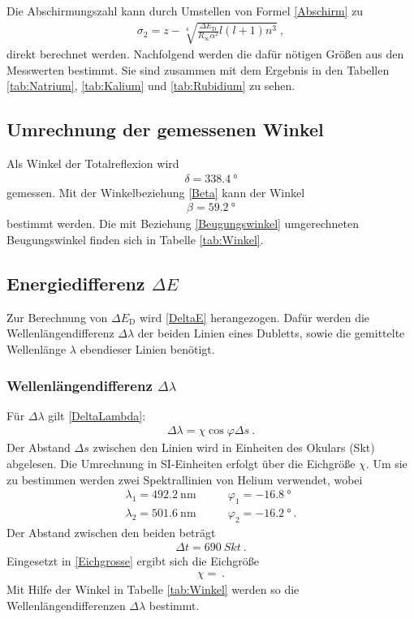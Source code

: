 Die Abschirmungszahl kann durch Umstellen von Formel \eqref{Abschirm} zu
\begin{align}
	\sigma_2 = z - \sqrt[4]{\frac{\Delta E_\text{D}}{R_\infty\alpha^2}l(l+1)n^3} \ ,
\end{align}
direkt berechnet werden. Nachfolgend werden die dafür nötigen Größen aus den Messwerten bestimmt. Sie sind zusammen mit dem Ergebnis in den Tabellen \ref{tab:Natrium}, \ref{tab:Kalium} und \ref{tab:Rubidium} zu sehen.
\subsection{Umrechnung der gemessenen Winkel \label{sec:Umrechnung}}
Als Winkel der Totalreflexion wird
\begin{align}
	\delta = \SI{338.4}{\degree}
\end{align}
gemessen. Mit der Winkelbeziehung \eqref{Beta} kann der Winkel
\begin{align}
	\beta = \SI{59.2}{\degree}
\end{align}
bestimmt werden. Die mit Beziehung \eqref{Beugungswinkel} umgerechneten Beugungswinkel finden sich in Tabelle \ref{tab:Winkel}.

\subsection{Energiedifferenz $\Delta E$}
Zur Berechnung von $\Delta E_\text{D}$ wird \eqref{DeltaE} herangezogen. Dafür werden die Wellenlängendifferenz $\Delta\lambda$ der beiden Linien eines Dubletts, sowie die gemittelte Wellenlänge $\lambda$ ebendieser Linien benötigt.
\clearpage

\subsubsection{Wellenlängendifferenz $\Delta\lambda$}
Für $\Delta\lambda$ gilt \eqref{DeltaLambda}:
\begin{align}
	\Delta\lambda = \chi\cos\varphi\Delta s \ .
\end{align}
Der Abstand $\Delta s$ zwischen den Linien wird in Einheiten des Okulars  (\si{Skt}) abgelesen. Die Umrechnung in SI-Einheiten erfolgt über die Eichgröße $\chi$. Um sie zu bestimmen werden zwei Spektrallinien von Helium verwendet, wobei
\begin{align}
	\lambda_1 = \SI{492.2}{\nano\meter} \qquad& \varphi_1 = \SI{-16.8}{\degree} \\
	\lambda_2 = \SI{501.6}{\nano\meter} \qquad& \varphi_2 = \SI{-16.2}{\degree} \ .
\end{align}
Der Abstand zwischen den beiden beträgt
\begin{align}
	\Delta t = \SI{690}{Skt} \ .
\end{align}
Eingesetzt in \eqref{Eichgrosse} ergibt sich die Eichgröße
\begin{align}
	\chi =  \ .
\end{align}
Mit Hilfe der Winkel in Tabelle \ref{tab:Winkel} werden so die Wellenlängendifferenzen $\Delta\lambda$ bestimmt.
